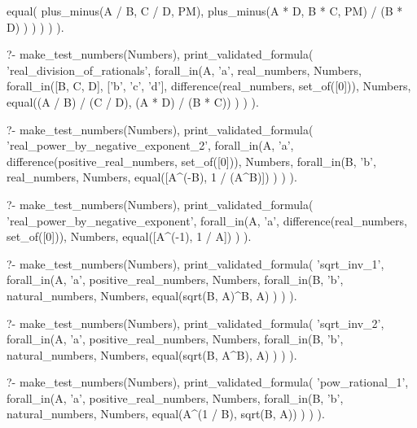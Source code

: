 \begin{fact}
\begin{prolog}
					equal(
						plus_minus(A / B, C / D, PM),
						plus_minus(A * D, B * C, PM) / (B * D)
					)
				)
			)
		)
	).
\end{prolog}
\begin{prolog}
?-	make_test_numbers(Numbers),
	print_validated_formula(
		'real_division_of_rationals',
		forall_in(A, 'a', real_numbers, Numbers,
			forall_in([B, C, D], ['b', 'c', 'd'], difference(real_numbers, set_of([0])), Numbers,
				equal((A / B) / (C / D), (A * D) / (B * C))
			)
		)
	).
\end{prolog}
\begin{prolog}
?-	make_test_numbers(Numbers),
	print_validated_formula(
		'real_power_by_negative_exponent_2',
		forall_in(A, 'a', difference(positive_real_numbers, set_of([0])), Numbers,
			forall_in(B, 'b', real_numbers, Numbers,
				equal([A^(-B), 1 / (A^B)])
			)
		)
	).
\end{prolog}
\begin{prolog}
?-	make_test_numbers(Numbers),
	print_validated_formula(
		'real_power_by_negative_exponent',
		forall_in(A, 'a', difference(real_numbers, set_of([0])), Numbers,
			equal([A^(-1), 1 / A])
		)
	).
\end{prolog}
\begin{prolog}
?-	make_test_numbers(Numbers),
	print_validated_formula(
		'sqrt_inv_1',
		forall_in(A, 'a', positive_real_numbers, Numbers,
			forall_in(B, 'b', natural_numbers, Numbers,
				equal(sqrt(B, A)^B, A)
			)
		)
	).				
\end{prolog}
\begin{prolog}
?-	make_test_numbers(Numbers),
	print_validated_formula(
		'sqrt_inv_2',
		forall_in(A, 'a', positive_real_numbers, Numbers,
			forall_in(B, 'b', natural_numbers, Numbers,
				equal(sqrt(B, A^B), A)
			)
		)
	).				
\end{prolog}
\begin{prolog}
?-	make_test_numbers(Numbers),
	print_validated_formula(
		'pow_rational_1',
		forall_in(A, 'a', positive_real_numbers, Numbers,
			forall_in(B, 'b', natural_numbers, Numbers,
				equal(A^(1 / B), sqrt(B, A))
			)
		)
	).				
\end{prolog}
\begin{prolog}

\end{prolog}
\end{fact}
